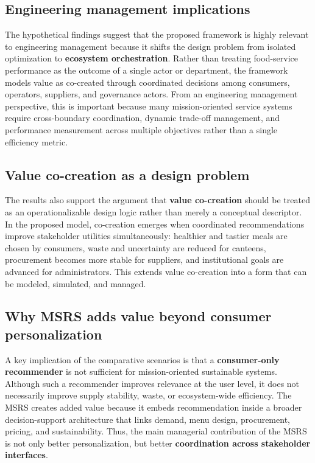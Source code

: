 \documentclass[
  letterpaper,
  DIV=11,
  numbers=noendperiod]{scrartcl}
\begin{document}
\subsection{Engineering management
implications}\label{engineering-management-implications}

The hypothetical findings suggest that the proposed framework is highly
relevant to engineering management because it shifts the design problem
from isolated optimization to \textbf{ecosystem orchestration}. Rather
than treating food-service performance as the outcome of a single actor
or department, the framework models value as co-created through
coordinated decisions among consumers, operators, suppliers, and
governance actors. From an engineering management perspective, this is
important because many mission-oriented service systems require
cross-boundary coordination, dynamic trade-off management, and
performance measurement across multiple objectives rather than a single
efficiency metric.

\subsection{Value co-creation as a design
problem}\label{value-co-creation-as-a-design-problem}

The results also support the argument that \textbf{value co-creation}
should be treated as an operationalizable design logic rather than
merely a conceptual descriptor. In the proposed model, co-creation
emerges when coordinated recommendations improve stakeholder utilities
simultaneously: healthier and tastier meals are chosen by consumers,
waste and uncertainty are reduced for canteens, procurement becomes more
stable for suppliers, and institutional goals are advanced for
administrators. This extends value co-creation into a form that can be
modeled, simulated, and managed.

\subsection{Why MSRS adds value beyond consumer
personalization}\label{why-msrs-adds-value-beyond-consumer-personalization}

A key implication of the comparative scenarios is that a
\textbf{consumer-only recommender} is not sufficient for
mission-oriented sustainable systems. Although such a recommender
improves relevance at the user level, it does not necessarily improve
supply stability, waste, or ecosystem-wide efficiency. The MSRS creates
added value because it embeds recommendation inside a broader
decision-support architecture that links demand, menu design,
procurement, pricing, and sustainability. Thus, the main managerial
contribution of the MSRS is not only better personalization, but better
\textbf{coordination across stakeholder interfaces}.
\end{document}
